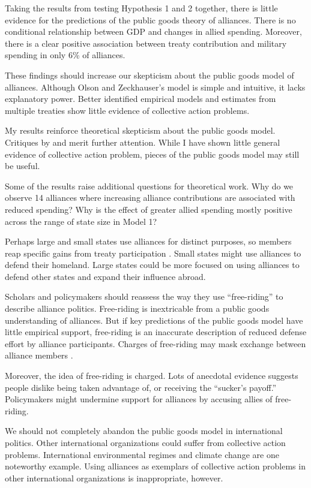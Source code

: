\documentclass[12pt]{article}
\begin{document}
Taking the results from testing Hypothesis 1 and 2 together, there is little evidence for the predictions of the public goods theory of alliances. 
There is no conditional relationship between GDP and changes in allied spending.
Moreover, there is a clear positive association between treaty contribution and military spending in only 6\% of alliances. 


These findings should increase our skepticism about the public goods model of alliances. 
Although Olson and Zeckhauser's model is simple and intuitive, it lacks explanatory power. 
Better identified empirical models and estimates from multiple treaties show little evidence of collective action problems. 

My results reinforce theoretical skepticism about the public goods model. 
Critiques by \citet{Palmer1990} and \citet{SandlerHartley2001} merit further attention. 
While I have shown little general evidence of collective action problem, pieces of the public goods model may still be useful. 


Some of the results raise additional questions for theoretical work. 
Why do we observe 14 alliances where increasing alliance contributions are associated with reduced spending?
Why is the effect of greater allied spending mostly positive across the range of state size in Model 1? 


Perhaps large and small states use alliances for distinct purposes, so members reap specific gains from treaty participation \citep{Morrow1991}. 
Small states might use alliances to defend their homeland. 
Large states could be more focused on using alliances to defend other states and expand their influence abroad. 


Scholars and policymakers should reassess the way they use ``free-riding'' to describe alliance politics. 
Free-riding is inextricable from a public goods understanding of alliances.
But if key predictions of the public goods model have little empirical support, free-riding is an inaccurate description of reduced defense effort by alliance participants.  
Charges of free-riding may mask exchange between alliance members \citep{Lanoszka2015}. 


Moreover, the idea of free-riding is charged. 
Lots of anecdotal evidence suggests people dislike being taken advantage of, or receiving the ``sucker's payoff.'' 
Policymakers might undermine support for alliances by accusing allies of free-riding. 


We should not completely abandon the public goods model in international politics. 
Other international organizations could suffer from collective action problems.
International environmental regimes and climate change are one noteworthy example.  
Using alliances as exemplars of collective action problems in other international organizations is inappropriate, however. 
\end{document}
